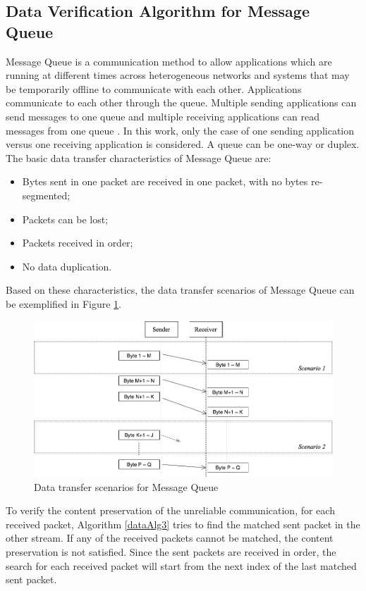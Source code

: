 \documentclass[12pt,oneside]{book}
\begin{document}
\subsection{Data Verification Algorithm for Message Queue}
Message Queue is a communication method to allow applications which are running at different times across heterogeneous networks and systems that may be temporarily offline to communicate with each other. Applications communicate to each other through the queue. Multiple sending applications can send messages to one queue and multiple receiving applications can read messages from one queue \cite{redkar2004pro}. In this work, only the case of one sending application versus one receiving application is considered. A queue can be one-way or duplex. The basic data transfer characteristics of Message Queue are:
\begin{itemize}
  \item Bytes sent in one packet are received in one packet, with no bytes re-segmented;
  \item Packets can be lost;
  \item Packets received in order;
  \item No data duplication.
\end{itemize}
Based on these characteristics, the data transfer scenarios of Message Queue can be exemplified in Figure \ref{msmq}.
\begin{figure}[H]
\centerline{\includegraphics[scale=0.4]{Figures/msmq}}
\caption{Data transfer scenarios for Message Queue}
\label{msmq}
\end{figure}

To verify the content preservation of the unreliable communication, for each received packet, Algorithm \ref{dataAlg3} tries to find the matched sent packet in the other stream. If any of the received packets cannot be matched, the content preservation is not satisfied. Since the sent packets are received in order, the search for each received packet will start from the next index of the last matched sent packet. 
\end{document}
